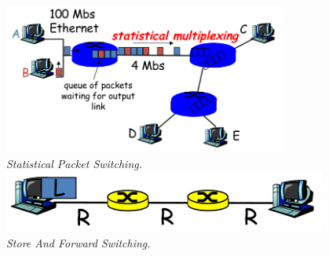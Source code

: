 \documentclass{article}
\begin{document}
\begin{enumerate}[$\bullet$]
\begin{center}
        \includegraphics[width=0.7\textwidth]{PacketSwitchingStatistical.png}\\
        \textit{Statistical Packet Switching.}\\
        
        \includegraphics[width=0.8\textwidth]{PacketSwitchingSF.png}\\
        \textit{Store And Forward Switching.}\\
    \end{center}
                

\end{enumerate}
\end{document}
